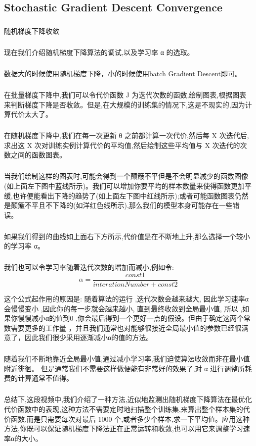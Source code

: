 \documentclass{article}
\begin{document}
\begin{CJK}{UTF8}{gbsn}
\subsection{Stochastic Gradient Descent Convergence}
\subparagraph{}
随机梯度下降收敛
\subparagraph{}
现在我们介绍随机梯度下降算法的调试,以及学习率 α 的选取。
\subparagraph{}
数据大的时候使用随机梯度下降，小的时候使用batch Gradient Descent即可。
\subparagraph{}
在批量梯度下降中,我们可以令代价函数 J 为迭代次数的函数,绘制图表,根据图表来判断梯度下降是否收敛。但是,在大规模的训练集的情况下,这是不现实的,因为计算代价太大了。
\begin{figure}[H]
\label{fig:11114}
\end{figure}
\subparagraph{}
在随机梯度下降中,我们在每一次更新 θ 之前都计算一次代价,然后每 X 次迭代后,求出这 X 次对训练实例计算代价的平均值,然后绘制这些平均值与 X 次迭代的次数之间的函数图表。
\subparagraph{}
当我们绘制这样的图表时,可能会得到一个颠簸不平但是不会明显减少的函数图像(如上面左下图中蓝线所示)。我们可以增加你要平均的样本数量来使得函数更加平缓,也许便能看出下降的趋势了(如上面左下图中红线所示);或者可能函数图表仍然是颠簸不平且不下降的(如洋红色线所示),那么我们的模型本身可能存在一些错误。
\subparagraph{}
如果我们得到的曲线如上面右下方所示,代价值是在不断地上升,那么选择一个较小的学习率 α。
\begin{figure}[H]
\label{fig:11115}
\end{figure}
\subparagraph{}
我们也可以令学习率随着迭代次数的增加而减小,例如令:
\begin{equation}
\alpha=\frac{const1}{interationNumber+const2}
\end{equation}
\begin{figure}[H]
\label{fig:11116}
\end{figure}
这个公式起作用的原因是: 随着算法的运行 ,迭代次数会越来越大, 因此学习速率α会慢慢变小 ,因此你的每一步就会越来越小, 直到最终收敛到全局最小值, 所以 ,如果你慢慢减小α的值到0 ,你会最后得到一个更好一点的假设。但由于确定这两个常数需要更多的工作量 ，并且我们通常也对能够很接近全局最小值的参数已经很满意了，因此我们很少采用逐渐减小α的值的方法。
\subparagraph{}
随着我们不断地靠近全局最小值,通过减小学习率,我们迫使算法收敛而非在最小值附近徘徊。 但是通常我们不需要这样做便能有非常好的效果了,对 α 进行调整所耗费的计算通常不值得。
\subparagraph{}
总结下,这段视频中,我们介绍了一种方法,近似地监测出随机梯度下降算法在最优化代价函数中的表现,这种方法不需要定时地扫描整个训练集,来算出整个样本集的代价函数,而是只需要每次对最后 1000 个,或者多少个样本,求一下平均值。应用这种方法,你既可以保证随机梯度下降法正在正常运转和收敛,也可以用它来调整学习速率α的大小。
\begin{figure}[H]
\label{fig:11117}
\end{figure}
\begin{figure}[H]
\label{fig:11118}
\end{figure}

\end{CJK}
\end{document}
